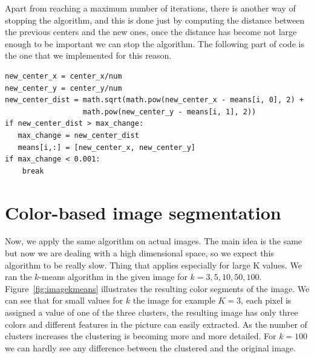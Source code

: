 \documentclass[a4paper,10pt,twoside]{article}
\begin{document}
Apart from reaching a maximum number of iterations, there is another way of stopping the algorithm, and this is done just by computing the distance between the previous centers and the new ones, once the distance has become not large enough to be important we can stop the algorithm. The following part of code is the one that we implemented for this reason.
\begin{verbatim}
new_center_x = center_x/num
new_center_y = center_y/num
new_center_dist = math.sqrt(math.pow(new_center_x - means[i, 0], 2) + 
                  math.pow(new_center_y - means[i, 1], 2))
if new_center_dist > max_change:
   max_change = new_center_dist
   means[i,:] = [new_center_x, new_center_y]
if max_change < 0.001:
    break
\end{verbatim}

\section{Color-based image segmentation}
Now, we apply the same algorithm on actual images. The main idea is the same but now we are dealing with a high dimensional space, so we expect this algorithm to be really slow. Thing that applies especially for large K values. We ran the $k$-means algorithm in the given image for $k = 3, 5, 10, 50, 100$. Figure~\ref{fig:imagekmeans} illustrates the resulting color segments of the image. We can see that for small values for $k$ the image for example $K = 3$, each pixel is assigned a value of one of the three clusters, the resulting image has only three colors and different features in the picture can easily extracted. As the number of clusters increases the clustering is becoming more and more detailed. For $k = 100$ we can hardly see any difference between the clustered and the original image.
\end{document}
